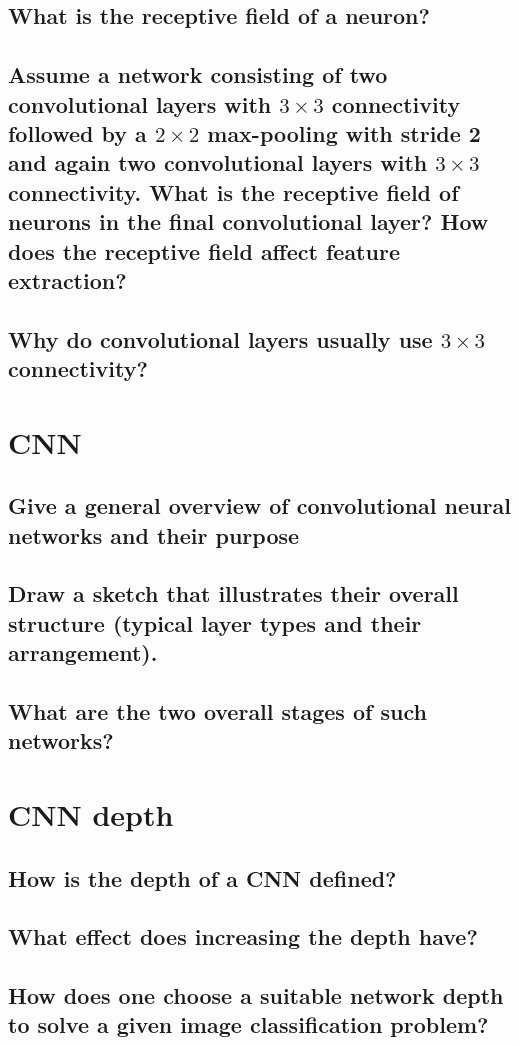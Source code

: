 \subsection{What is the receptive field of a neuron?}
\subsection{Assume a network consisting of two convolutional layers with $3 \times 3$ connectivity followed by a $2 \times 2$ max-pooling with stride 2 and again two convolutional layers with $3 \times 3$ connectivity. What is the receptive field of neurons in the final convolutional layer? How does the receptive field affect feature extraction? }
\subsection{Why do convolutional layers usually use $3 \times 3$ connectivity?}


\section{CNN}
\subsection{Give a general overview of convolutional neural networks and their purpose}
\subsection{Draw a sketch that illustrates their overall structure (typical layer types and their arrangement).}
\subsection{What are the two overall stages of such networks?}

\section{CNN depth}
\subsection{How is the depth of a CNN defined?}
\subsection{What effect does increasing the depth have?}
\subsection{How does one choose a suitable network depth to solve a given image classification problem?}

